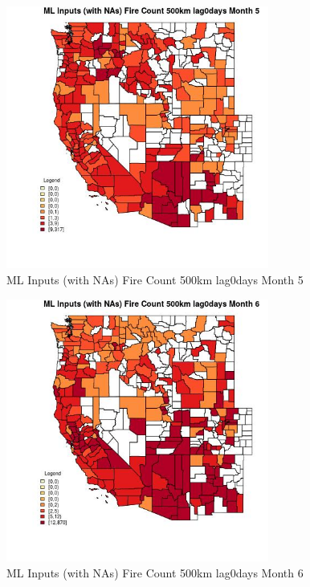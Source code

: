 \clearpage 

\begin{figure} 
\centering  
\includegraphics[width=0.77\textwidth]{Code_Outputs/Report_ML_input_PM25_Step4_part_e_de_duplicated_aves_compiled_2019-05-21wNAs_CountyFire_Count_500km_lag0daysmedianMonth5.jpg} 
\caption{\label{fig:Report_ML_input_PM25_Step4_part_e_de_duplicated_aves_compiled_2019-05-21wNAsCountyFire_Count_500km_lag0daysmedianMonth5}ML Inputs (with NAs) Fire Count 500km lag0days Month 5} 
\end{figure} 
 

\begin{figure} 
\centering  
\includegraphics[width=0.77\textwidth]{Code_Outputs/Report_ML_input_PM25_Step4_part_e_de_duplicated_aves_compiled_2019-05-21wNAs_CountyFire_Count_500km_lag0daysmedianMonth6.jpg} 
\caption{\label{fig:Report_ML_input_PM25_Step4_part_e_de_duplicated_aves_compiled_2019-05-21wNAsCountyFire_Count_500km_lag0daysmedianMonth6}ML Inputs (with NAs) Fire Count 500km lag0days Month 6} 
\end{figure} 
 

